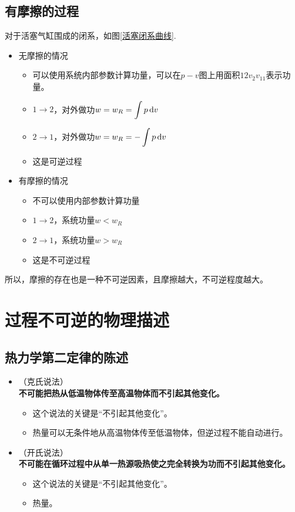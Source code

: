 \subsection{有摩擦的过程}
\noindent 对于活塞气缸围成的闭系，如图\ref{活塞闭系曲线}.
\begin{itemize}
	\item 无摩擦的情况
	\begin{itemize}
		\item 可以使用系统内部参数计算功量，可以在$p - v$图上用面积$12v_2v_11$表示功量。
		\item $1 \to 2$，对外做功$\displaystyle w = w_R = \int p \, {\rm{d}} v$
		\item $2 \to 1$，对外做功$\displaystyle w = w_R = - \int p \, {\rm{d}} v$
		\item 这是可逆过程
	\end{itemize}
	\item 有摩擦的情况
	\begin{itemize}
		\item 不可以使用内部参数计算功量
		\item $1 \to 2$，系统功量$w < w_R$
		\item $2 \to 1$，系统功量$w > w_R$
		\item 这是不可逆过程
	\end{itemize}
\end{itemize}

所以，摩擦的存在也是一种不可逆因素，且摩擦越大，不可逆程度越大。



\section{过程不可逆的物理描述}
\subsection{热力学第二定律的陈述}
\begin{itemize}
	\item {}（克氏说法） \\
	\hspace*{2em} \textbf{不可能把热从低温物体传至高温物体而不引起其他变化。}
	\begin{itemize}
		\item 这个说法的关键是“不引起其他变化”。
		\item 热量可以无条件地从高温物体传至低温物体，但逆过程不能自动进行。
	\end{itemize}
	\item {}（开氏说法） \\
	\hspace*{2em}\textbf{不可能在循环过程中从单一热源吸热使之完全转换为功而不引起其他变化。}
	\begin{itemize}
		\item 这个说法的关键是“不引起其他变化”。
		\item 热量。
	\end{itemize}
\end{itemize}

